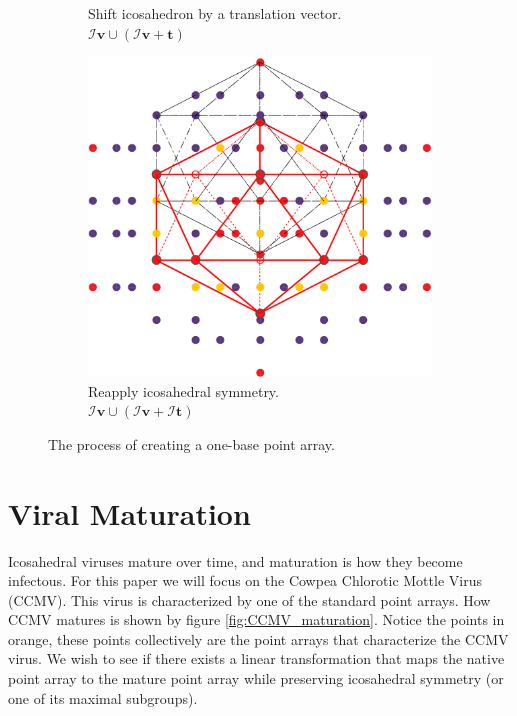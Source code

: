 \documentclass[a4paper,10pt]{article}
\theoremstyle{plain}
\theoremstyle{definition}
\theoremstyle{remark}
\renewcommand{\vec}[1]{\textbf{#1}}
\begin{document}
\begin{figure}[h]
\begin{subfigure}{0.3\textwidth}
		\caption{Shift icosahedron by a translation vector. \(\mathcal{I}\vec{v} \cup (\mathcal{I}\vec{v} + \vec{t})\)}
	\end{subfigure}
	\hfill
	\begin{subfigure}{0.35\textwidth}
		\centering
		\includegraphics[width=\textwidth]{images/p_arr_construction_3.pdf}
		\caption{Reapply icosahedral symmetry. \\ \(\mathcal{I}\vec{v} \cup (\mathcal{I}\vec{v} + \mathcal{I}\vec{t})\)}
	\end{subfigure}
	\caption{The process of creating a one-base point array.}
	\label{fig:point_array_construction}
\end{figure}

\section{Viral Maturation}
Icosahedral viruses mature over time, and maturation is how they become infectous.
For this paper we will focus on the Cowpea Chlorotic Mottle Virus (CCMV).
This virus is characterized by one of the standard point arrays.
How CCMV matures is shown by figure \ref{fig:CCMV_maturation}.
Notice the points in orange, these points collectively are the point arrays that characterize the CCMV virus.
We wish to see if there exists a linear transformation that maps the native point array to the mature point array while preserving icosahedral symmetry (or one of its maximal subgroups).
\end{document}
